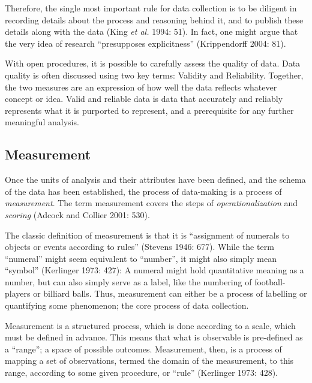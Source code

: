 \documentclass[12pt,twoside]{reedthesis}
\begin{document}
Therefore, the single most important rule for data collection is to be
diligent in recording details about the process and reasoning behind it,
and to publish these details along with the data (King \emph{et al.}
1994: 51). In fact, one might argue that the very idea of research
``presupposes explicitness'' (Krippendorff 2004: 81).

With open procedures, it is possible to carefully assess the quality of
data. Data quality is often discussed using two key terms: Validity and
Reliability. Together, the two measures are an expression of how well
the data reflects whatever concept or idea. Valid and reliable data is
data that accurately and reliably represents what it is purported to
represent, and a prerequisite for any further meaningful analysis.

\subsection{Measurement}\label{measurement}

Once the units of analysis and their attributes have been defined, and
the schema of the data has been established, the process of data-making
is a process of \emph{measurement}. The term measurement covers the
steps of \emph{operationalization} and \emph{scoring} (Adcock and
Collier 2001: 530).

The classic definition of measurement is that it is ``assignment of
numerals to objects or events according to rules'' (Stevens 1946: 677).
While the term ``numeral'' might seem equivalent to ``number'', it might
also simply mean ``symbol'' (Kerlinger 1973: 427): A numeral might hold
quantitative meaning as a number, but can also simply serve as a label,
like the numbering of football-players or billiard balls. Thus,
measurement can either be a process of labelling or quantifying some
phenomenon; the core process of data collection.

Measurement is a structured process, which is done according to a scale,
which must be defined in advance. This means that what is observable is
pre-defined as a ``range''; a space of possible outcomes. Measurement,
then, is a process of mapping a set of observations, termed the domain
of the measurement, to this range, according to some given procedure, or
``rule'' (Kerlinger 1973: 428).
\end{document}
